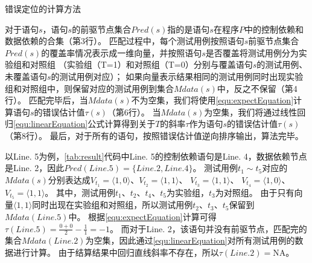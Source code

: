 \begin{algorithm}[!ht]
	
	
	\caption{错误定位的计算方法} 
	
	
	\label{alg:fault-localization}
	
	
	
	
\end{algorithm}


对于语句$s$，语句$s$的前驱节点集合$Pred(s)$指的是语句$s$在程序$P$中的控制依赖和数据依赖的合集（第3行）。
匹配过程中，每个测试用例按照语句$s$前驱节点集合$Pred(s)$的覆盖率情况表示成一维向量，并按照语句$s$是否覆盖将测试用例分为实验组和对照组
（实验组（T=1）和对照组（T=0）分别与覆盖语句$s$的测试用例、未覆盖语句$s$的测试用例对应）；
如果向量表示结果相同的测试用例同时出现实验组和对照组中，则保留对应的测试用例到集合$Mdata(s)$中，反之不保留（第4行）。
匹配完毕后，当$Mdata(s)$不为空集，我们将使用\autoref{equ:expectEquation}计算语句$s$的错误估计值$\tau(s)$（第6行）。
当$Mdata(s)$为空集，我们将通过线性回归\autoref{equ:linearEquation}公式计算得到关于$T$的斜率$\tau$作为语句$s$的错误估计值$\tau(s)$（第8行）。
最后，对于所有的语句，按照错误估计值逆向排序输出，算法完毕。


以Line. 5为例，\autoref{tab:result}代码中Line. 5的控制依赖语句是Line. 4，数据依赖节点是Line. 2，因此$Pred(Line.  5) = \{ Line. 2, Line. 4\}$。
测试用例$t_1 \sim t_5$对应的$Mdata(s)$分别表达成$V_{t_1}=\langle1,0\rangle$、$V_{t_2}=\langle1,1\rangle$、 $V_{t_3}=\langle1,1\rangle$、 $V_{t_4}=\langle1,0\rangle$、$V_{t_5}=\langle1,1\rangle$。
其中，测试用例$t_1$、$t_2$、$t_4$、$t_5$为实验组，$t_3$为对照组。
由于只有向量$\langle1,1\rangle$同时出现在实验组和对照组，所以测试用例$t_2$、$t_3$、$t_5$保留到$Mdata(Line. 5)$中。
根据\autoref{equ:expectEquation}计算可得$\tau(Line. 5) = \frac{0+0}{2}-\frac{1}{1}=-1$。
而对于Line. 2，该语句并没有前驱节点，匹配完的集合$Mdata(Line. 2)$为空集，因此通过\autoref{equ:linearEquation}对所有测试用例的数据进行计算。
由于结算结果中回归直线斜率不存在，所以$\tau(Line. 2)= \text{NA}$。



